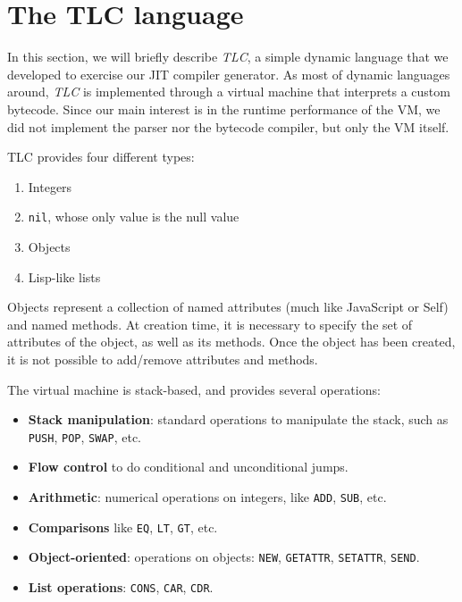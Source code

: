 \section{The TLC language}


In this section, we will briefly describe \emph{TLC}, a simple dynamic
language that we developed to exercise our JIT compiler generator.  As most of
dynamic languages around, \emph{TLC} is implemented through a virtual machine
that interprets a custom bytecode. Since our main interest is in the runtime
performance of the VM, we did not implement the parser nor the bytecode
compiler, but only the VM itself.

TLC provides four different types:
\begin{enumerate}
\item Integers
\item \lstinline{nil}, whose only value is the null value
\item Objects
\item Lisp-like lists
\end{enumerate}

Objects represent a collection of named attributes (much like JavaScript or
Self) and named methods.  At creation time, it is necessary to specify the set
of attributes of the object, as well as its methods.  Once the object has been
created, it is not possible to add/remove attributes and methods.

The virtual machine is stack-based, and provides several operations:

\begin{itemize}
\item \textbf{Stack manipulation}: standard operations to manipulate the
  stack, such as \lstinline{PUSH}, \lstinline{POP}, \lstinline{SWAP}, etc.
\item \textbf{Flow control} to do conditional and unconditional jumps.
\item \textbf{Arithmetic}: numerical operations on integers, like
  \lstinline{ADD}, \lstinline{SUB}, etc.
\item \textbf{Comparisons} like \lstinline{EQ}, \lstinline{LT},
  \lstinline{GT}, etc.
\item \textbf{Object-oriented}: operations on objects: \lstinline{NEW},
  \lstinline{GETATTR}, \lstinline{SETATTR}, \lstinline{SEND}.
\item \textbf{List operations}: \lstinline{CONS}, \lstinline{CAR},
  \lstinline{CDR}.
\end{itemize}

